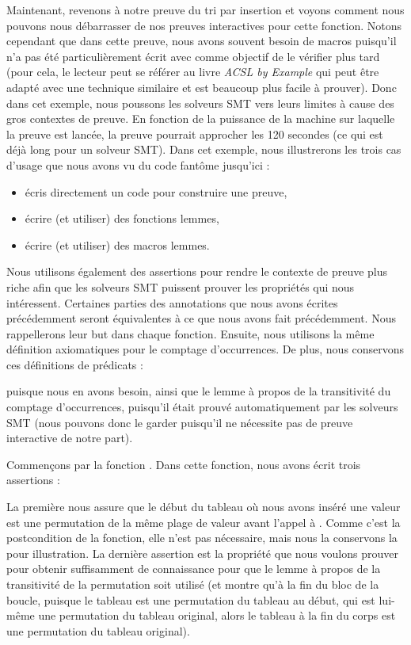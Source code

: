 Maintenant, revenons à notre preuve du tri par insertion et voyons comment nous
pouvons nous débarrasser de nos preuves interactives pour cette fonction. Notons
cependant que dans cette preuve, nous avons souvent besoin de macros puisqu'il
n'a pas été particulièrement écrit avec comme objectif de le vérifier plus tard
(pour cela, le lecteur peut se référer au livre \emph{ACSL by Example} qui peut être
adapté avec une technique similaire et est beaucoup plus facile à prouver). Donc
dans cet exemple, nous poussons les solveurs SMT vers leurs limites à cause des
gros contextes de preuve. En fonction de la puissance de la machine sur laquelle
la preuve est lancée, la preuve pourrait approcher les 120 secondes (ce qui est
déjà long pour un solveur SMT). Dans cet exemple, nous illustrerons les trois
cas d'usage que nous avons vu du code fantôme jusqu'ici :


\begin{itemize}
    \item écris directement un code pour construire une preuve,
    \item écrire (et utiliser) des fonctions lemmes,
    \item écrire (et utiliser) des macros lemmes.
\end{itemize}


Nous utilisons également des assertions pour rendre le contexte de preuve plus
riche afin que les solveurs SMT puissent prouver les propriétés qui nous intéressent.
Certaines parties des annotations que nous avons écrites précédemment seront
équivalentes à ce que nous avons fait précédemment. Nous rappellerons leur
but dans chaque fonction. Ensuite, nous utilisons la même définition axiomatiques
pour le comptage d'occurrences. De plus, nous conservons ces définitions de
prédicats :




puisque nous en avons besoin, ainsi que le lemme à propos de la transitivité du
comptage d'occurrences, puisqu'il était prouvé automatiquement par les solveurs
SMT (nous pouvons donc le garder puisqu'il ne nécessite pas de preuve interactive
de notre part).




Commençons par la fonction . Dans cette fonction,
nous avons écrit trois assertions :




La première nous assure que le début du tableau où nous avons inséré une valeur
est une permutation de la même plage de valeur avant l'appel à .
Comme c'est la postcondition de la fonction, elle n'est pas nécessaire, mais nous
la conservons la pour illustration. La dernière assertion est la propriété que
nous voulons prouver pour obtenir suffisamment de connaissance pour que le
lemme à propos de la transitivité de la permutation soit utilisé (et montre qu'à
la fin du bloc de la boucle, puisque le tableau est une permutation du tableau
au début, qui est lui-même une permutation du tableau original, alors le tableau
à la fin du corps est une permutation du tableau original).


